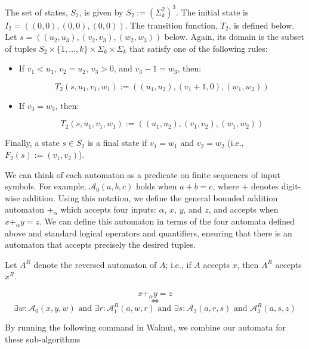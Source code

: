 \documentclass[a4paper]{article}
\theoremstyle{definition}
\theoremstyle{remark}
\theoremstyle{remark}
\theoremstyle{plain}
\begin{document}
The set of states, $S_2$, is given by $S_2 := (\Sigma_k^2)^3$.
The initial state is $I_2 = ((0,0),(0,0),(0,0))$.
The transition function, $T_2$, is defined below.
Let $s = ((u_2,u_3),(v_2,v_3),(w_2,w_3))$ below.
Again, its domain is the subset of tuples $S_2 \times \{1,\ldots,k\} \times \Sigma_k \times \Sigma_k$ that satisfy one of the following rules:

\begin{itemize}
    \item If $v_1 < u_1$, $v_2 = u_2$, $v_3 > 0$, and $v_3 - 1 = w_3$, then:
    
    $$T_2(s,u_1,v_1,w_1) := ((u_1,u_2),(v_1+1,0),(w_1,w_2))$$
    
    \item If $v_3 = w_3$, then:
    
    $$T_2(s,u_1,v_1,w_1) := ((u_1,u_2),(v_1,v_2),(w_1,w_2))$$
\end{itemize}

Finally, a state $s \in S_2$ is a final state if $v_1 = w_1$ and $v_2 = w_2$ (i.e., $F_2(s) := (v_1,v_2)$).

We can think of each automaton as a predicate on finite sequences of input symbols.
For example, $\mathcal{A}_0(a,b,c)$ holds when $a + b = c$, where $+$ denotes digit-wise addition.
Using this notation, we define the general bounded addition automaton $+_{\alpha}$ which accepts four inputs: $\alpha$, $x$, $y$, and $z$, and accepts when $x +_{\alpha} y = z$.
We can define this automaton in terms of the four automata defined above and standard logical operators and quantifiers, ensuring that there is an automaton that accepts precisely the desired tuples.

Let $A^R$ denote the reversed automaton of $A$; i.e., if $A$ accepts $x$, then $A^R$ accepts $x^R$.

\begin{equation*}
    x +_{\alpha} y = z
\end{equation*}
\begin{equation*}
    \iff
\end{equation*}
\begin{equation*}
    \exists w : \mathcal{A}_0(x,y,w) \text{ and } \exists r : \mathcal{A}_1^R(a,w,r) \text{ and } \exists s : \mathcal{A}_2(a,r,s) \text{ and } \mathcal{A}_3^R(a,s,z)
\end{equation*}

By running the following command in Walnut, we combine our automata for these sub-algorithms 
\end{document}
